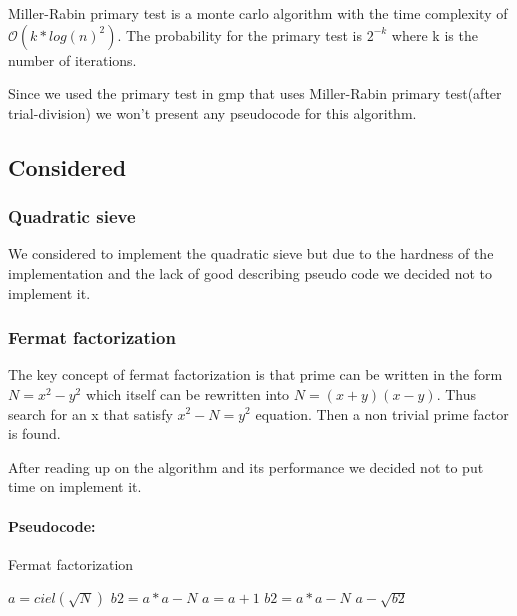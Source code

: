 Miller-Rabin primary test is a monte carlo algorithm with the time complexity of $\mathcal{O}(k*log(n)^2)$. The
probability for the primary test is $2^{-k}$ where k is the number of iterations.

Since we used the primary test in gmp that uses Miller-Rabin primary test(after trial-division) we won’t present any pseudocode for this algorithm. 


\subsection{Considered}

\subsubsection{Quadratic sieve}

We considered to implement the quadratic sieve but due to the hardness of the implementation and the lack of good describing pseudo code we decided not to implement it.

\subsubsection{Fermat factorization}

The key concept of fermat factorization is that prime can be written in the form $N = x^2 - y^2$ which itself can be rewritten into $N = (x+y)(x-y)$. Thus search for an x that satisfy $x^2 - N = y^2$ equation. Then a non trivial prime factor is found.   

After reading up on the algorithm and its performance we decided not to put time on implement it.

\paragraph{Pseudocode:}

\textcolor{white}{ }

\begin{algorithm}[H]
\caption{Fermat factorization}
\begin{algorithmic}
	\State $a = ciel(\sqrt{N})$
	\State $b2 = a*a - N$
		\State $a = a + 1$
		\State $b2 = a*a - N$
	\EndWhile	
	\State \Return $a - \sqrt{b2}$
\EndFunction
\end{algorithmic}
\end{algorithm}